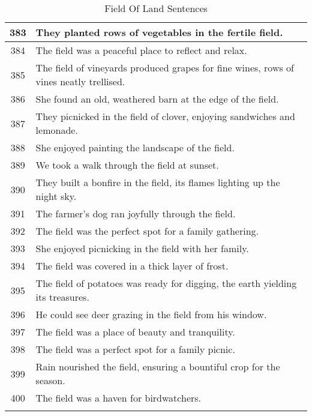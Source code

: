 \begin{longtable}{|c|p{12cm}|}
383 & They planted rows of vegetables in the fertile field. \\ \hline
384 & The field was a peaceful place to reflect and relax. \\ \hline
385 & The field of vineyards produced grapes for fine wines, rows of vines neatly trellised. \\ \hline
386 & She found an old, weathered barn at the edge of the field. \\ \hline
387 & They picnicked in the field of clover, enjoying sandwiches and lemonade. \\ \hline
388 & She enjoyed painting the landscape of the field. \\ \hline
389 & We took a walk through the field at sunset. \\ \hline
390 & They built a bonfire in the field, its flames lighting up the night sky. \\ \hline
391 & The farmer's dog ran joyfully through the field. \\ \hline
392 & The field was the perfect spot for a family gathering. \\ \hline
393 & She enjoyed picnicking in the field with her family. \\ \hline
394 & The field was covered in a thick layer of frost. \\ \hline
395 & The field of potatoes was ready for digging, the earth yielding its treasures. \\ \hline
396 & He could see deer grazing in the field from his window. \\ \hline
397 & The field was a place of beauty and tranquility. \\ \hline
398 & The field was a perfect spot for a family picnic. \\ \hline
399 & Rain nourished the field, ensuring a bountiful crop for the season. \\ \hline
400 & The field was a haven for birdwatchers. \\ \hline

    \caption{Field Of Land Sentences}
    \label{tab:field_land}
    \end{longtable}
    